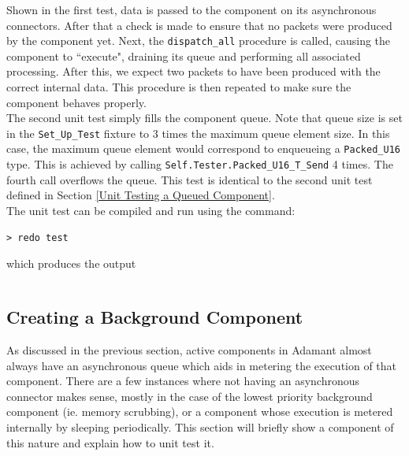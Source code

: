 Shown in the first test, data is passed to the component on its asynchronous connectors. After that a check is made to ensure that no packets were produced by the component yet. Next, the \texttt{dispatch\_all} procedure is called, causing the component to ``execute", draining its queue and performing all associated processing. After this, we expect two packets to have been produced with the correct internal data. This procedure is then repeated to make sure the component behaves properly. \\

The second unit test simply fills the component queue. Note that queue size is set in the \texttt{Set\_Up\_Test} fixture to 3 times the maximum queue element size. In this case, the maximum queue element would correspond to enqueueing a \texttt{Packed\_U16} type. This is achieved by calling \texttt{Self.Tester.Packed\_U16\_T\_Send} 4 times. The fourth call overflows the queue. This test is identical to the second unit test defined in Section \ref{Unit Testing a Queued Component}. \\

The unit test can be compiled and run using the command:

\vspace{5mm} %
\begin{verbatim}
> redo test
\end{verbatim}
\vspace{5mm} %

which produces the output

\vspace{5mm} %
\inputminted{text}{../example_architecture/active_component/test/output.txt}
\vspace{5mm} %

\subsection{Creating a Background Component} \label{Creating a Background Component}

As discussed in the previous section, active components in Adamant almost always have an asynchronous queue which aids in metering the execution of that component. There are a few instances where not having an asynchronous connector makes sense, mostly in the case of the lowest priority background component (ie. memory scrubbing), or a component whose execution is metered internally by sleeping periodically. This section will briefly show a component of this nature and explain how to unit test it.

